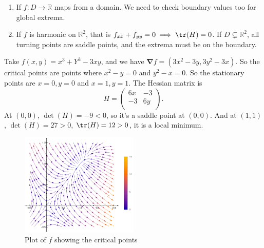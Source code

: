 \begin{remark}
    \begin{enumerate}
        \item If \(f: D \to \mathbb{R}\) maps from a domain. We need to check boundary values too for global extrema.
        \item If \(f\) is harmonic on \(\mathbb{R}^2\), that is \(f_{xx} + f_{yy} = 0 \implies \tr(H) = 0\). If \(D \subsetneq \mathbb{R}^2\), all turning points are saddle points, and the extrema must be on the boundary.
    \end{enumerate}
\end{remark}
\begin{example}
    Take \(f(x, y) = x^3 + Y^3 - 3xy\), and we have \(\boldsymbol{\nabla}f = (3x^2 - 3y, 3y^2 - 3x)\). So the critical points are points where \(x^2 - y = 0\) and \(y^2 - x = 0\). So the stationary points are \(x = 0, y = 0\) and \(x = 1, y = 1\). The Hessian matrix is
    \[
        H = \begin{pmatrix}
            6x & -3 \\
            -3 & 6y \\
        \end{pmatrix}.
    \]
    At \((0,0)\), \(\det(H) = -9 < 0\), so it's a saddle point at \((0,0)\). And at \((1,1)\), \(\det(H) = 27 > 0\), \(\tr(H) = 12 > 0\), it is a local minimum.
    \begin{figure}[htpb]
        \centering
        \includegraphics[width=0.5\textwidth]{Figures/fig_1_1.pdf}
        \caption{Plot of \(f\) showing the critical points}
        \label{fig_1_1}
    \end{figure}
\end{example}
